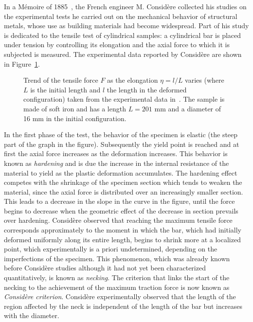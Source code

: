 \documentclass[a4paper,10pt,twoside]{amsbook}
\numberwithin{section}{chapter}
\numberwithin{equation}{chapter}
\theoremstyle{definition}
\begin{document}
In a Mémoire of 1885~\cite{Considere1885}, the French engineer M. Considère collected his studies on the experimental tests he carried out on the mechanical behavior of structural metals, whose use as building materials had become widespread. Part of his study is dedicated to the tensile test of cylindrical samples: a cylindrical bar is placed under tension by controlling its elongation and the axial force to which it is subjected is measured. The experimental data reported by Considère are shown in Figure~\ref{fig:considere}.
\begin{figure}[h]
\caption{Trend of the tensile force $F$ as the elongation $\eta=l/L$ varies (where $L$ is the initial length and $l$ the length in the deformed configuration) taken from the experimental data in~\cite{Considere1885}. The sample is made of soft iron and has a length $L=201$ mm and a diameter of 16 mm in the initial configuration.}
\label{fig:considere}
\end{figure}
In the first phase of the test, the behavior of the specimen is elastic (the steep part of the graph in the figure). Subsequently the yield point is reached and at first the axial force increases as the deformation increases. This behavior is known as \emph{hardening} and is due the increase in the internal resistance of the material to yield as the plastic deformation accumulates. The hardening effect competes with the shrinkage of the specimen section which tends to weaken the material, since the axial force is distributed over an increasingly smaller section. This leads to a decrease in the slope in the curve in the figure, until the force begins to decrease when the geometric effect of the decrease in section prevails over hardening. Considère observed that reaching the maximum tensile force corresponds approximately to the moment in which the bar, which had initially deformed uniformly along its entire length, begins to shrink more at a localized point, which experimentally is a priori undetermined, depending on the imperfections of the specimen. This phenomenon, which was already known before Considère studies although it had not yet been characterized quantitatively, is known as \emph{necking}. The criterion that links the start of the necking to the achievement of the maximum traction force is now known as \emph{Considère criterion}. Considère experimentally observed that the length of the region affected by the neck is independent of the length of the bar but increases with the diameter.
\end{document}
